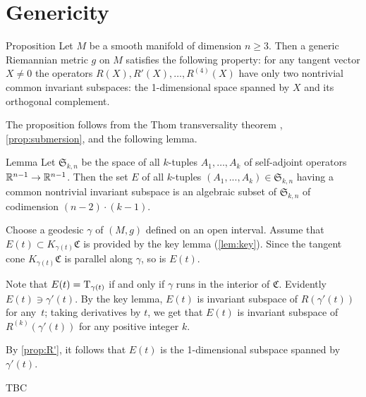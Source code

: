 \documentclass[a4paper,10pt]{article}
\begin{document}
\section{Genericity}

\begin{thm}{Proposition}\label{prop:R'}
Let $M$ be a smooth manifold of dimension $n\ge 3$.
Then a generic Riemannian metric $g$ on $M$ satisfies the following property:
for any tangent vector $X\ne 0$ the operators
$R(X), R'(X), \dots, R^{(4)}(X)$ have only two nontrivial common invariant subspaces: the 1-dimensional space spanned by $X$ and its orthogonal complement.
\end{thm}

The proposition follows from the Thom transversality theorem \cite[2.3.2]{eliashberg-mishachev}, \ref{prop:submersion}, and the following lemma.


\begin{thm}{Lemma}
Let $\mathfrak{S}_{k,n}$ be the space of all $k$-tuples $A_1,\dots, A_k$ of self-adjoint operators $\mathbb{R}^{n-1}\to\mathbb{R}^{n-1}$.
Then the set $E$ of all $k$-tuples $(A_1,...,A_k) \in \mathfrak{S}_{k,n}$ having a common nontrivial invariant subspace is an algebraic subset of $\mathfrak{S}_{k,n}$ of codimension $(n-2)\cdot (k-1)$.
\end{thm}

\qeds

Choose a geodesic $\gamma$ of $(M,g)$ defined on an open interval.
Assume that $E(t)\subset K_{\gamma(t)}\mathfrak{C}$ is provided by the key lemma (\ref{lem:key}).
Since the tangent cone $K_{\gamma(t)}\mathfrak{C}$ is parallel along $\gamma$, so is $E(t)$.

Note that $E(t)=\mathrm{T}_{\gamma(t)}$ if and only if $\gamma$ runs in the interior of $\mathfrak{C}$.
Evidently $E(t)\ni \gamma'(t)$.
By the key lemma, $E(t)$ is invariant subspace of $R(\gamma'(t))$ for any~$t$;
taking derivatives by $t$, we get that $E(t)$ is invariant subspace of $R^{(k)}(\gamma'(t))$ for any positive integer $k$.

By \ref{prop:R'}, it follows that $E(t)$ is the 1-dimensional subspace spanned by $\gamma'(t)$.

TBC
\qeds




\end{document}
